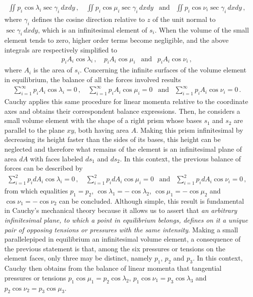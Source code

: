 \begin{eqnarray*}
\iint p_i\cos\lambda_i\sec\gamma_i\,dxdy\,, \quad \iint p_i\cos\mu_i\sec\gamma_i\,dxdy &\text{and}& \iint p_i\cos\nu_i\sec\gamma_i\,dxdy\,,
\end{eqnarray*}
where $\gamma_i$ defines the cosine direction relative to $z$ of the unit normal to $\sec\gamma_i\,dxdy$, which is an infinitesimal element of $s_i$. When the volume of the small element tends to zero, higher order terms become negligible, and the above integrals are respectively simplified to        
\begin{eqnarray*}
p_iA_i\cos\lambda_i\,, \quad p_iA_i\cos\mu_i  &\text{and}& p_iA_i\cos\nu_i\,,
\end{eqnarray*}
where $A_i$ is the area of $s_i$. Concerning the infinite surfaces of the volume element in equilibrium, the balance of all the forces involved results
\begin{eqnarray*}
\sum_{i=1}^\infty p_iA_i\cos\lambda_i=0\,, \quad \sum_{i=1}^\infty p_iA_i\cos\mu_i=0 &\text{and}& \sum_{i=1}^\infty p_iA_i\cos\nu_i=0\,.
\end{eqnarray*}
Cauchy applies this same procedure for linear momenta relative to the coordinate axes and obtains their correspondent balance expressions. Then, he considers a small volume element with the shape of a right prism whose bases $s_1$ and $s_2$ are parallel to the plane $xy$, both having area $A$. Making this prism infinitesimal by decreasing its height faster than the sides of its bases, this height can be neglected and therefore what remains of the element is an infinitesimal plane of area $dA$ with faces labeled $ds_1$ and $ds_2$. In this context, the previous balance of forces can be described by  
\begin{eqnarray*}
\sum_{i=1}^2 p_idA_i\cos\lambda_i=0\,, \quad \sum_{i=1}^2 p_idA_i\cos\mu_i=0 &\text{and}& \sum_{i=1}^2 p_idA_i\cos\nu_i=0\,,
\end{eqnarray*}
from which equalities $p_1=p_2$, $\cos\lambda_1=-\cos\lambda_2$, $\cos\mu_1=-\cos\mu_2$ and  $\cos\nu_1=-\cos\nu_2$ can be concluded. Although simple, this result is fundamental in Cauchy's mechanical theory because it allows us to assert that \emph{an arbitrary infinitesimal  plane, to which a point in equilibrium belongs, defines on it a unique pair of opposing tensions or pressures with the same intensity}. Making a small parallelepiped in equilibrium an infinitesimal volume element, a consequence of the previous statement is that, among the six pressures or tensions on the element faces, only three may be distinct, namely $p_1$, $p_2$ and $p_3$. In this context, Cauchy then obtains from the balance of linear momenta that tangential pressures or tensions $p_1\cos\mu_1=p_2\cos\lambda_2$, $p_1\cos\nu_1=p_3\cos\lambda_3$ and $p_2\cos\nu_2=p_3\cos\mu_3$. 

